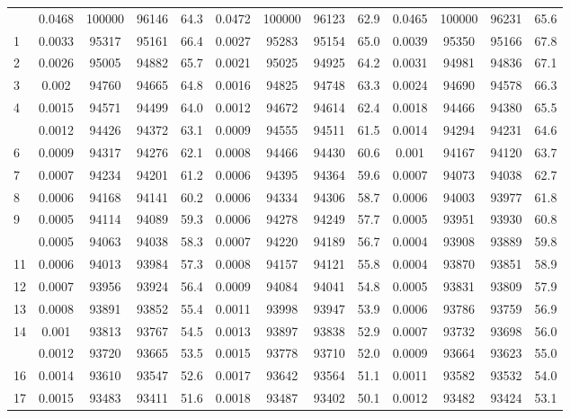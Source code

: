 \documentclass[
  14pt,
]{article}
\begin{document}
\begin{longtable}[t]{lcccccccccccc}
\endfoot
\bottomrule
\endlastfoot
0 & 0.0468 & 100000 & 96146 & 64.3 & 0.0472 & 100000 & 96123 & 62.9 & 0.0465 & 100000 & 96231 & 65.6\\
1 & 0.0033 & 95317 & 95161 & 66.4 & 0.0027 & 95283 & 95154 & 65.0 & 0.0039 & 95350 & 95166 & 67.8\\
2 & 0.0026 & 95005 & 94882 & 65.7 & 0.0021 & 95025 & 94925 & 64.2 & 0.0031 & 94981 & 94836 & 67.1\\
3 & 0.002 & 94760 & 94665 & 64.8 & 0.0016 & 94825 & 94748 & 63.3 & 0.0024 & 94690 & 94578 & 66.3\\
4 & 0.0015 & 94571 & 94499 & 64.0 & 0.0012 & 94672 & 94614 & 62.4 & 0.0018 & 94466 & 94380 & 65.5\\
\addlinespace
5 & 0.0012 & 94426 & 94372 & 63.1 & 0.0009 & 94555 & 94511 & 61.5 & 0.0014 & 94294 & 94231 & 64.6\\
6 & 0.0009 & 94317 & 94276 & 62.1 & 0.0008 & 94466 & 94430 & 60.6 & 0.001 & 94167 & 94120 & 63.7\\
7 & 0.0007 & 94234 & 94201 & 61.2 & 0.0006 & 94395 & 94364 & 59.6 & 0.0007 & 94073 & 94038 & 62.7\\
8 & 0.0006 & 94168 & 94141 & 60.2 & 0.0006 & 94334 & 94306 & 58.7 & 0.0006 & 94003 & 93977 & 61.8\\
9 & 0.0005 & 94114 & 94089 & 59.3 & 0.0006 & 94278 & 94249 & 57.7 & 0.0005 & 93951 & 93930 & 60.8\\
\addlinespace
10 & 0.0005 & 94063 & 94038 & 58.3 & 0.0007 & 94220 & 94189 & 56.7 & 0.0004 & 93908 & 93889 & 59.8\\
11 & 0.0006 & 94013 & 93984 & 57.3 & 0.0008 & 94157 & 94121 & 55.8 & 0.0004 & 93870 & 93851 & 58.9\\
12 & 0.0007 & 93956 & 93924 & 56.4 & 0.0009 & 94084 & 94041 & 54.8 & 0.0005 & 93831 & 93809 & 57.9\\
13 & 0.0008 & 93891 & 93852 & 55.4 & 0.0011 & 93998 & 93947 & 53.9 & 0.0006 & 93786 & 93759 & 56.9\\
14 & 0.001 & 93813 & 93767 & 54.5 & 0.0013 & 93897 & 93838 & 52.9 & 0.0007 & 93732 & 93698 & 56.0\\
\addlinespace
15 & 0.0012 & 93720 & 93665 & 53.5 & 0.0015 & 93778 & 93710 & 52.0 & 0.0009 & 93664 & 93623 & 55.0\\
16 & 0.0014 & 93610 & 93547 & 52.6 & 0.0017 & 93642 & 93564 & 51.1 & 0.0011 & 93582 & 93532 & 54.0\\
17 & 0.0015 & 93483 & 93411 & 51.6 & 0.0018 & 93487 & 93402 & 50.1 & 0.0012 & 93482 & 93424 & 53.1\\

\end{longtable}
\end{document}
